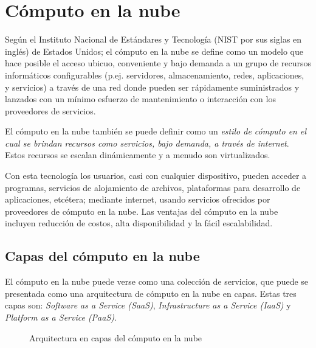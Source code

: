 \section{Cómputo en la nube}
\label{\detokenize{chapter_one/cloud_computing:computo-en-la-nube}}\label{\detokenize{chapter_one/cloud_computing::doc}}

\begin{remark}
Según el Instituto Nacional de Estándares y Tecnología (NIST por sus siglas en inglés) de Estados Unidos;
el cómputo en la
nube se define como un modelo que hace posible el acceso ubicuo, conveniente
y bajo demanda a un grupo de recursos informáticos configurables
(p.ej. servidores, almacenamiento, redes, aplicaciones, y servicios) a través
de una red donde pueden ser rápidamente suministrados y
lanzados con un mínimo esfuerzo de mantenimiento
o interacción con los proveedores de servicios.
\end{remark}


El cómputo en la nube también se puede definir como un \textit{estilo de cómputo en el cual
se brindan recursos como servicios, bajo demanda, a través de internet}.
Estos recursos se escalan dinámicamente y a menudo son virtualizados.

Con esta tecnología los usuarios, casi con cualquier dispositivo, pueden acceder
a programas, servicios de alojamiento de archivos, plataformas para desarrollo de
aplicaciones, etcétera; mediante internet, usando servicios ofrecidos por
proveedores de cómputo en la nube. Las ventajas del cómputo en la nube incluyen
reducción de costos, alta disponibilidad y la fácil escalabilidad.


\subsection{Capas del cómputo en la nube}
\label{\detokenize{chapter_one/cloud_computing:capas-del-computo-en-la-nube}}
El cómputo en la nube puede verse como una colección de servicios, que puede se
presentada como una arquitectura de cómputo en la nube en capas. Estas
tres capas son: \textit{Software as a Service (SaaS)},
\textit{Infrastructure as a Service (IaaS)} y \textit{Platform as a Service (PaaS)}.

\begin{figure}[ht]
\centering
\capstart

\noindent{}
\caption{Arquitectura en capas del cómputo en la nube}\label{\detokenize{chapter_one/cloud_computing:c-c-layers}}\end{figure}


